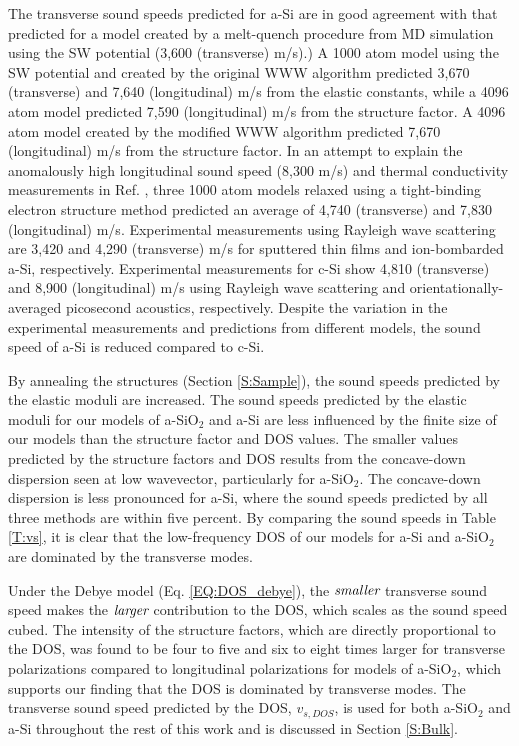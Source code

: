 \documentclass[aps,prb,onecolumn,preprint,superscriptaddress,footinbib,amsmath,amssymb,floatfix]{revtex4}
\begin{document}
The transverse sound speeds predicted for 
a-Si are in good agreement with that predicted for a model 
created by a melt-quench procedure from MD simulation using 
the SW potential (3,600 (transverse) m/s).\cite{kluge_elastic_1988}) 
A 1000 atom model using the SW potential and created by the 
original WWW algorithm predicted 3,670 (transverse) 
and 7,640 (longitudinal) m/s from 
the elastic constants,\cite{feldman_elastic_1991} 
while a 4096 atom model predicted 7,590 (longitudinal) m/s 
from the structure factor.\cite{feldman_calculations_2002} 
A 4096 atom model created by the modified WWW algorithm
\cite{barkema_high-quality_2000} predicted 
7,670 (longitudinal) m/s from the structure factor.
\cite{christie_vibrational_2007} In an attempt to explain the  
anomalously high longitudinal sound speed (8,300 m/s) and  
thermal conductivity measurements in Ref. , 
three 1000 atom models relaxed using a tight-binding electron 
structure method predicted an average of 4,740 (transverse) and 
7,830 (longitudinal) m/s.\cite{liu_high_2009} Experimental 
measurements using Rayleigh wave scattering 
are 3,420 and 4,290 (transverse) m/s for sputtered thin films 
and ion-bombarded a-Si, respectively.\cite{vacher_attenuation_1980}
Experimental measurements for c-Si show 4,810 (transverse) and 
8,900 (longitudinal) m/s using Rayleigh wave scattering
\cite{vacher_attenuation_1980}
and orientationally-averaged picosecond 
acoustics, respectively.\cite{yang_anomalously_2010} 
Despite the variation in the experimental measurements and predictions 
from different models, the sound speed of a-Si is reduced 
compared to c-Si.

By annealing the structures (Section \ref{S:Sample}), 
the sound speeds predicted by the elastic moduli are increased. 
The sound speeds predicted by the elastic moduli 
for our models of a-SiO$_2$ and a-Si are less influenced 
by the finite size of our models than the structure factor and DOS 
values.    
The smaller values predicted by the structure factors and DOS 
results from the concave-down dispersion seen at low 
wavevector, particularly for a-SiO$_2$. The concave-down dispersion 
is less pronounced for a-Si, where the sound speeds predicted 
by all three methods are within five percent. 
By comparing the sound speeds in Table \ref{T:vs}, it is clear that 
the low-frequency DOS of our models for a-Si and a-SiO$_2$ are 
dominated by the 
transverse modes.  

Under the Debye model (Eq. \eqref{EQ:DOS_debye}), 
the $\emph{smaller}$ transverse sound speed 
makes the $\emph{larger}$ contribution to the DOS, which scales 
as the sound speed cubed. 
The intensity of the structure factors, which   
are directly proportional to the DOS,
\cite{beltukov_ioffe-regel_2013} was found 
to be four to five\cite{taraskin_phonons_1997} 
and six to eight\cite{horbach_high_2001} times larger for 
transverse polarizations compared to longitudinal polarizations 
for models of a-SiO$_2$, 
which supports our finding that the DOS is dominated 
by transverse modes. 
The transverse sound speed predicted by the DOS, $v_{s,DOS}$, is used 
for both 
a-SiO$_2$ and a-Si throughout the rest of this work and is discussed 
in Section \ref{S:Bulk}.
\end{document}
